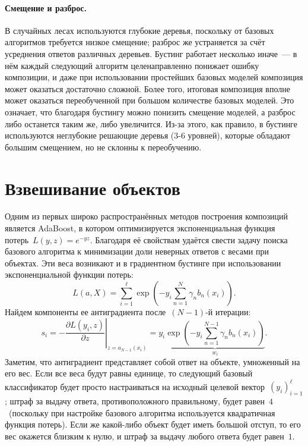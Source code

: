 \documentclass[12pt,fleqn]{article}
\begin{document}
\paragraph{Смещение и разброс.}

В случайных лесах используются глубокие деревья, поскольку от базовых алгоритмов
требуется низкое смещение; разброс же устраняется за счёт усреднения ответов различных деревьев.
Бустинг работает несколько иначе~--- в нём каждый следующий алгоритм целенаправленно
понижает ошибку композиции, и даже при использовании простейших базовых моделей композиция может
оказаться достаточно сложной.
Более того, итоговая композиция вполне может оказаться переобученной при большом количестве
базовых моделей.
Это означает, что благодаря бустингу можно понизить смещение моделей, а разброс либо
останется таким же, либо увеличится.
Из-за этого, как правило, в бустинге используются неглубокие решающие деревья (3-6 уровней),
которые обладают большим смещением, но не склонны к переобучению.


\section{Взвешивание объектов}
Одним из первых широко распространённых методов построения композиций
является AdaBoost, в котором оптимизируется экспоненциальная функция потерь~$L(y, z) = e^{-yz}$.
Благодаря её свойствам удаётся свести задачу поиска базового алгоритма
к минимизации доли неверных ответов с весами при объектах.
Эти веса возникают и в градиентном бустинге при использовании экспоненциальной функции потерь:
\[
    L(a, X)
    =
    \sum_{i = 1}^{\ell}
        \exp\left(
            -y_i
            \sum_{n = 1}^{N}
                \gamma_n
                b_n(x_i)
            \right).
\]
Найдем компоненты ее антиградиента после~$(N - 1)$-й итерации:
\[
    s_i
    =
    -
    \left.
    \frac{\partial L(y_i, z)}{\partial z}
    \right|_{z = a_{N - 1}(x_i)}
    =
    y_i
    \underbrace{
        \exp\left(
            -y_i
            \sum_{n = 1}^{N - 1}
                \gamma_n b_n(x_i)
        \right)
    }_{w_i}.
\]
Заметим, что антиградиент представляет собой
ответ на объекте, умноженный на его вес.
Если все веса будут равны единице, то следующий
базовый классификатор будет просто настраиваться на
исходный целевой вектор~$(y_i)_{i = 1}^{\ell}$;
штраф за выдачу ответа, противоположного правильному,
будет равен~$4$~(поскольку при настройке базового
алгоритма используется квадратичная функция потерь).
Если же какой-либо объект будет иметь большой отступ,
то его вес окажется близким к нулю,
и штраф за выдачу любого ответа будет равен~$1$.
\end{document}
